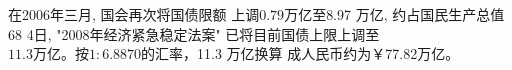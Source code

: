 \documentclass{article}
\begin{document}
\begin{CJK*}{UTF8}{gbsn}

在2006年三月, 国会再次将国债限额 
上调$0.79万亿 至$8.97 万亿,
约占国民生产总值 68%
4日, "2008年经济紧急稳定法案" 
已将目前国债上限上调至$11.3 万亿。

按 1:6.8870 的汇率，$11.3 万亿换算
成人民币约为￥77.82万亿。


\clearpage\end{CJK*}
\end{document}

